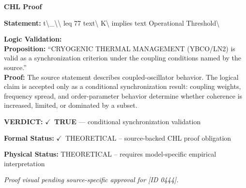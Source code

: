 \vspace{0.45em}
\noindent\textbf{CHL Proof}\par
\textbf{Statement:} t\textbackslash{}\_\textbackslash{}\textbackslash{} leq 77 text\textbackslash{} K\textbackslash{} implies text Operational Threshold\textbackslash{}

\textbf{Logic Validation:}\\
\textbf{Proposition:} ``CRYOGENIC THERMAL MANAGEMENT (YBCO/LN2) is valid as a synchronization criterion under
the coupling conditions named by the source.''\\
\textbf{Proof:} The source statement describes coupled-oscillator behavior. The logical claim is
accepted only as a conditional synchronization result: coupling weights, frequency
spread, and order-parameter behavior determine whether coherence is increased, limited,
or dominated by a subset.

\textbf{VERDICT:} \ensuremath{\checkmark}\ \textbf{TRUE} --- conditional synchronization validation

\textbf{Formal Status:} \ensuremath{\checkmark}\ THEORETICAL -- source-backed CHL proof obligation

\textbf{Physical Status:} THEORETICAL -- requires model-specific empirical interpretation
\par\vspace{0.45em}
\par
\vfill
\begingroup\footnotesize\itshape
Proof visual pending source-specific approval for [ID 0444].
\par\endgroup
\vfill
\endgroup
\endgroup
